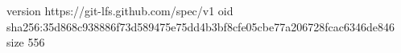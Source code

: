 version https://git-lfs.github.com/spec/v1
oid sha256:35d868c938886f73d589475e75dd4b3bf8cfe05cbe77a206728fcac6346de846
size 556
